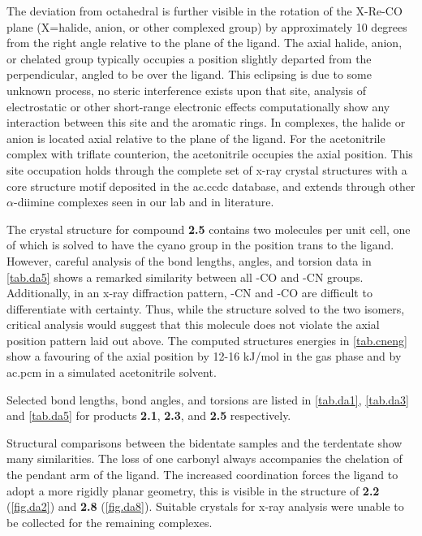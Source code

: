 The deviation from octahedral is further visible in the rotation of the X-Re-CO plane (X=halide, anion, or other complexed group) by approximately 10 degrees from the right angle relative to the plane of the ligand. The axial halide, anion, or chelated group typically occupies a position slightly departed from the perpendicular, angled to be over the ligand. This eclipsing is due to some unknown process, no steric interference exists upon that site, analysis of electrostatic or other short-range electronic effects computationally show any interaction between this site and the aromatic rings. In  complexes, the halide or anion is located axial relative to the plane of the ligand. For the acetonitrile complex with triflate counterion, the acetonitrile occupies the axial position. This site occupation holds through the complete set of x-ray crystal structures with a  core structure motif deposited in the \gls{ac.ccdc} database\autocite{allen2002}, and extends through other $\alpha$-diimine complexes seen in our lab and in literature\autocite{jurca2013}. 



The crystal structure for compound \textbf{2.5} contains two molecules per unit cell, one of which is solved to have the cyano group in the position trans to the ligand. However, careful analysis of the bond lengths, angles, and torsion data in \autoref{tab.da5} shows a remarked similarity between all -CO and -CN groups. Additionally, in an x-ray diffraction pattern, -CN and -CO are difficult to differentiate with certainty. Thus, while the structure solved to the two isomers, critical analysis would suggest that this molecule does not violate the axial position pattern laid out above. The computed structures energies in \autoref{tab.cneng} show a favouring of the axial position by 12-16 kJ/mol in the gas phase and by \gls{ac.pcm} in a simulated acetonitrile solvent. 

Selected bond lengths, bond angles, and torsions are listed in \autoref{tab.da1}, \autoref{tab.da3} and \autoref{tab.da5} for products \textbf{2.1}, \textbf{2.3}, and \textbf{2.5} respectively.





\FloatBarrier

Structural comparisons between the bidentate samples and the terdentate show many similarities. The loss of one carbonyl always accompanies the chelation of the pendant arm of the ligand. The increased coordination forces the ligand to adopt a more rigidly planar geometry, this is visible in the structure of \textbf{2.2} (\autoref{fig.da2}) and \textbf{2.8} (\autoref{fig.da8}). Suitable crystals for x-ray analysis were unable to be collected for the remaining complexes.

